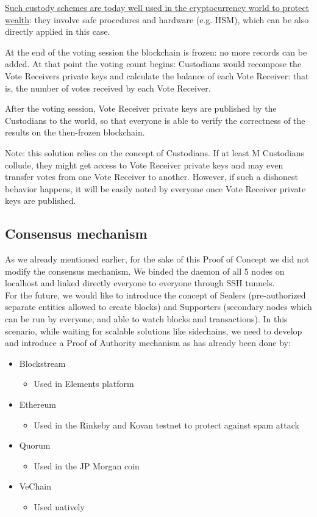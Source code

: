\documentclass[10pt, letterpaper]{article}
\begin{document}
\underline{Such custody schemes are today well used in the cryptocurrency world to protect wealth}: they involve safe procedures and hardware (e.g. HSM), which can be also directly applied in this case.
\bigskip

At the end of the voting session the blockchain is frozen: no more records can be added. At that point the voting count begins: Custodians would recompose the Vote Receivers private keys and calculate the balance of each Vote Receiver: that is, the number of votes received by each Vote Receiver.
\bigskip

After the voting session, Vote Receiver private keys are published by the Custodians to the world, so that everyone is able to verify the correctness of the results on the then-frozen blockchain.
\bigskip

Note: this solution relies on the concept of Custodians. If at least M Custodians collude, they might get access to Vote Receiver private keys and may even transfer votes from one Vote Receiver to another. However, if such a dishonest behavior happens, it will be easily noted by everyone once Vote Receiver private keys are published. 
\subsection{Consensus mechanism}
As we already mentioned earlier, for the sake of this Proof of Concept we did not modify the consensus mechanism. We binded the daemon of all 5 nodes on localhost and linked directly everyone to everyone through SSH tunnels.\\
For the future, we would like to introduce the concept of Sealers (pre-authorized separate entities allowed to create blocks) and Supporters (secondary nodes which can be run by everyone, and able to watch blocks and transactions). In this scenario, while waiting for scalable solutions like sidechains, we need to develop and introduce a Proof of Authority mechanism as has already been done by:
\begin{itemize}
\item Blockstream
\begin{itemize}
\item Used in Elements platform
\end{itemize}
\item Ethereum
\begin{itemize}
\item Used in the Rinkeby and Kovan testnet to protect against spam attack
\end{itemize}
\item Quorum
\begin{itemize}
\item Used in the JP Morgan coin
\end{itemize}
\item VeChain
\begin{itemize}
\item Used natively
\end{itemize}
\end{itemize}
\end{document}
